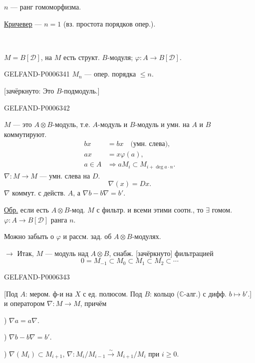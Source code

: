 \(n\) --- ранг гомоморфизма.

\underline{Кричевер} --- \(n=1\) (вз. простота порядков опер.).
\par\smallskip\noindent\textemdash\,\textperiodcentered\,\textemdash\par
\(M=B[\mathcal D]\), на \(M\) есть структ. \(B\)-модуля;
\(\varphi:A\to B[\mathcal D]\).


\begin{GelfandAdjacentEvidence}{GELFAND-P000634}{1}
\(M_n\) --- опер. порядка \(\le n\).

[зачёркнуто: Это \(B\)-подмодуль.]
\end{GelfandAdjacentEvidence}
\begin{GelfandAdjacentEvidence}{GELFAND-P000634}{2}


\(M\) --- это \(A\otimes B\)-модуль, т.е.
\(A\)-модуль и \(B\)-модуль и умн. на
\(A\) и \(B\) коммутируют.
\[
\begin{aligned}
bx&=bx \quad\text{(умн. слева)},\\
ax&=x\varphi(a),\\
a\in A&\Rightarrow aM_i\subset M_{i+\operatorname{deg}a\cdot n}.
\end{aligned}
\]
\(\nabla:M\to M\) --- умн. слева на \(D\).
\[
\nabla(x)=Dx.
\]
\(\nabla\) коммут. с действ. \(A\), а \(\nabla b-b\nabla=b'\).

\underline{Обр.} если есть \(A\otimes B\)-мод. \(M\)
с фильтр. и всеми этими соотн., то \(\exists\) гомом. \(\varphi:A\to B[\mathcal D]\)
ранга \(n\).

Можно забыть о \(\varphi\) и рассм. зад. об \(A\otimes B\)-модулях.

\(\rightarrow\) Итак, \(M\) --- модуль над \(A\otimes B\),
снабж. [зачёркнуто] фильтрацией
\[
0=M_{-1}\subset M_0\subset M_1\subset M_2\subset\cdots
\]
\end{GelfandAdjacentEvidence}
\begin{GelfandAdjacentEvidence}{GELFAND-P000634}{3}

[Под \(A\): мером. ф-и на \(X\) с ед. полюсом.
Под \(B\): кольцо (\(\mathbb C\)-алг.) с дифф. \(b\mapsto b'\).]
и оператором \(\nabla:M\to M\), причём

) \(\nabla a=a\nabla\).

) \(\nabla b-b\nabla=b'\).

) \(\nabla(M_i)\subset M_{i+1}\),
\(\nabla:M_i/M_{i-1}\overset{\sim}{\to} M_{i+1}/M_i\)
при \(i\geqslant0\).
\end{GelfandAdjacentEvidence}

